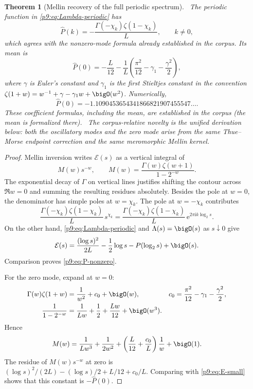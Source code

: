 \documentclass[11pt]{article}
\numberwithin{equation}{section}
\newtheorem{theorem}{Theorem}[section]
\theoremstyle{definition}
\theoremstyle{remark}
\newcommand{\e}{\mathrm e}
\newcommand{\ii}{\mathrm i}
\begin{document}
\begin{theorem}[Mellin recovery of the full periodic spectrum]\label{p9:thm:P-Fourier}
\statusE\ The periodic function in \eqref{p9:eq:Lambda-periodic} has
\begin{equation}
 \boxed{
 \widehat P(k)=-\frac{\Gamma(-\chi_k)\zeta(1-\chi_k)}L,
 \qquad k\ne0,}                                           \label{p9:eq:P-nonzero}
\end{equation}
which agrees with the nonzero-mode formula already established in the corpus.  Its mean is
\begin{equation}
 \boxed{
 \widehat P(0)
 =-\frac L{12}
 -\frac1L\left(\frac{\pi^2}{12}-\gamma_1-\frac{\gamma^2}{2}\right),} \label{p9:eq:P-mean}
\end{equation}
where $\gamma$ is Euler's constant and $\gamma_1$ is the first Stieltjes constant in the
convention
$\zeta(1+w)=w^{-1}+\gamma-\gamma_1w+\bigO(w^2)$.
Numerically,
\begin{equation}
 \widehat P(0)=-1.1090453654341866821907455547\ldots.       \label{p9:eq:P-mean-num}
\end{equation}
These coefficient formulas, including the mean, are established in the corpus (the mean is
formalized there).  \statusN\ The corpus-relative novelty is the unified derivation below:
both the oscillatory modes and the zero mode arise from the same Thue--Morse endpoint
correction and the same meromorphic Mellin kernel.
\end{theorem}

\begin{proof}
Mellin inversion writes $\mathcal E(s)$ as a vertical integral of
\[
 M(w)s^{-w},\qquad M(w)=\frac{\Gamma(w)\zeta(w+1)}{1-2^{-w}}.
\]
The exponential decay of $\Gamma$ on vertical lines justifies shifting the contour across
$\Re w=0$ and summing the resulting residues absolutely.  Besides the pole at $w=0$, the
denominator has simple poles at $w=\chi_k$.
The pole at $w=-\chi_k$ contributes
\[
 \frac{\Gamma(-\chi_k)\zeta(1-\chi_k)}L\,s^{\chi_k}
 =\frac{\Gamma(-\chi_k)\zeta(1-\chi_k)}L\,\e^{2\pi\ii k\log_2s}.
\]
On the other hand, \eqref{p9:eq:Lambda-periodic} and $\Lambda(s)=\bigO(s)$ as $s\downarrow0$
give
\begin{equation}
 \mathcal E(s)=\frac{(\log s)^2}{2L}-\frac12\log s
 -P(\log_2s)+\bigO(s).                                    \label{p9:eq:E-small}
\end{equation}
Comparison proves \eqref{p9:eq:P-nonzero}.

For the zero mode, expand at $w=0$:
\begin{align*}
 \Gamma(w)\zeta(1+w)
 &=\frac1{w^2}+c_0+\bigO(w),
 &c_0&=\frac{\pi^2}{12}-\gamma_1-\frac{\gamma^2}{2},\\
 \frac1{1-2^{-w}}
 &=\frac1{Lw}+\frac12+\frac{Lw}{12}+\bigO(w^3).
\end{align*}
Hence
\[
 M(w)=\frac1{Lw^3}+\frac1{2w^2}
 +\left(\frac L{12}+\frac{c_0}L\right)\frac1w+\bigO(1).
\]
The residue of $M(w)s^{-w}$ at zero is
$(\log s)^2/(2L)-(\log s)/2+L/12+c_0/L$.  Comparing with
\eqref{p9:eq:E-small} shows that this constant is $-\widehat P(0)$.
\end{proof}
\end{document}
